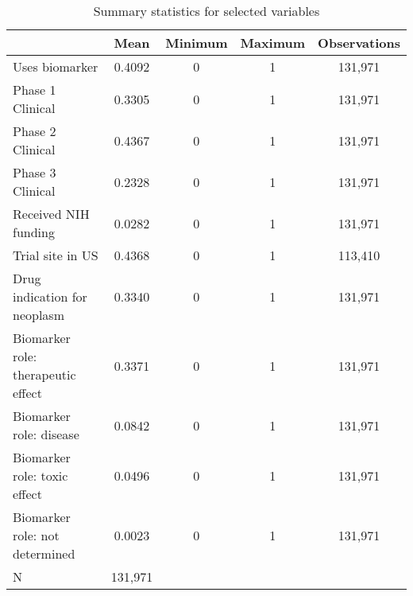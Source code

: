 \begin{table}[htbp]\centering
\def\sym#1{\ifmmode^{#1}\else\(^{#1}\)\fi}
\caption{Summary statistics for selected variables}
\begin{tabular}{l*{1}{cccc}}
\hline\hline
                    &        Mean&     Minimum&     Maximum&Observations\\
\hline
Uses biomarker      &      0.4092&           0&           1&     131,971\\
Phase 1 Clinical    &      0.3305&           0&           1&     131,971\\
Phase 2 Clinical    &      0.4367&           0&           1&     131,971\\
Phase 3 Clinical    &      0.2328&           0&           1&     131,971\\
Received NIH funding&      0.0282&           0&           1&     131,971\\
Trial site in US    &      0.4368&           0&           1&     113,410\\
Drug indication for neoplasm&      0.3340&           0&           1&     131,971\\
Biomarker role: therapeutic effect&      0.3371&           0&           1&     131,971\\
Biomarker role: disease&      0.0842&           0&           1&     131,971\\
Biomarker role: toxic effect&      0.0496&           0&           1&     131,971\\
Biomarker role: not determined&      0.0023&           0&           1&     131,971\\
\hline
N                   &     131,971&            &            &            \\
\hline\hline
\end{tabular}
\end{table}
